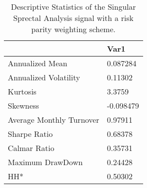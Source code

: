 \begin{table}[H]
\centering
\begin{tabular}{ll}
& Var1 \\ 
\hline 
Annualized Mean & 0.087284 \\ 
Annualized Volatility & 0.11302 \\ 
Kurtosis & 3.3759 \\ 
Skewness & -0.098479 \\ 
Average Monthly Turnover & 0.97911 \\ 
Sharpe Ratio & 0.68378 \\ 
Calmar Ratio & 0.35731 \\ 
Maximum DrawDown & 0.24428 \\ 
HH* & 0.50302 \\ 
\hline
\end{tabular}
\caption{Descriptive Statistics of the Singular Sprectal Analysis signal with a risk parity weighting scheme.}
\label{SSA_RP}
\end{table}
